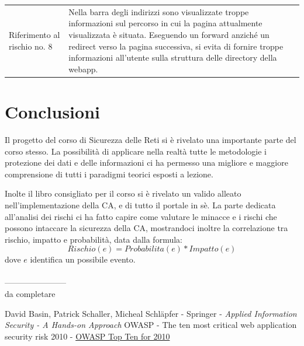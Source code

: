 \documentclass{article}
\begin{document}
\begin{footnotesize}
\begin{longtable}{p{0.3cm}p{4cm}p{7cm}}
Riferimento al rischio no. 8 & Nella barra degli indirizzi sono visualizzate troppe informazioni sul percorso in cui la pagina attualmente visualizzata è situata.
Eseguendo un forward anziché un redirect verso la pagina successiva, si evita di fornire troppe informazioni all'utente sulla struttura delle directory della webapp.\\
\end{longtable}
\end{footnotesize}

\section{Conclusioni}
Il progetto del corso di Sicurezza delle Reti si è rivelato una importante parte del corso stesso. La possibilità di applicare nella realtà tutte le metodologie i protezione dei dati e delle informazioni ci ha permesso una migliore e maggiore comprensione di tutti i paradigmi teorici esposti a lezione.

Inolte il libro consigliato per il corso \cite{applied security} si è rivelato un valido alleato nell'implementazione della CA, e di tutto il portale in sè.
La parte dedicata all'analisi dei rischi ci ha fatto capire come valutare le minacce e i rischi che possono intaccare la sicurezza della CA, mostrandoci inoltre la correlazione tra rischio, impatto e probabilità, data dalla formula:
$$ Rischio( e ) = Probabilita( e ) * Impatto( e ) $$
dove $e$ identifica un possibile evento.
\\ \\ 
-----------------------
\\ da completare
 
\begin{thebibliography}{9}
David Basin, Patrick Schaller, Micheal Schl\"apfer - Springer - \textit {Applied Information Security - A Hands-on Approach}
OWASP - The ten most critical web application security risk 2010 - \href{http://owasptop10.googlecode.com/files/OWASP\%20Top\%2010\%20-\%202010.pdf}{OWASP Top Ten for 2010}
 
\end{thebibliography}
\end{document}
